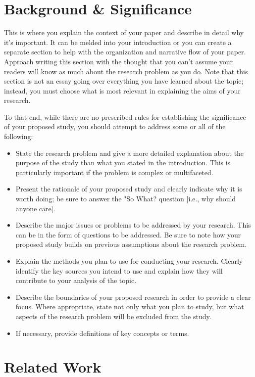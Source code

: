 \documentclass[10pt,twocolumn,letterpaper]{article}
\begin{document}
\section{Background \& Significance}
This is where you explain the context of your paper and describe in detail why it's important. It can be melded into your introduction or you can create a separate section to help with the organization and narrative flow of your paper. Approach writing this section with the thought that you can’t assume your readers will know as much about the research problem as you do. Note that this section is not an essay going over everything you have learned about the topic; instead, you must choose what is most relevant in explaining the aims of your research.

To that end, while there are no prescribed rules for establishing the significance of your proposed study, you should attempt to address some or all of the following:

\begin{itemize}
   \item State the research problem and give a more detailed explanation about the purpose of the study than what you stated in the introduction. This is particularly important if the problem is complex or multifaceted.
    \item Present the rationale of your proposed study and clearly indicate why it is worth doing; be sure to answer the "So What? question [i.e., why should anyone care].
    \item Describe the major issues or problems to be addressed by your research. This can be in the form of questions to be addressed. Be sure to note how your proposed study builds on previous assumptions about the research problem.
    \item Explain the methods you plan to use for conducting your research. Clearly identify the key sources you intend to use and explain how they will contribute to your analysis of the topic.
   \item Describe the boundaries of your proposed research in order to provide a clear focus. Where appropriate, state not only what you plan to study, but what aspects of the research problem will be excluded from the study.
   \item If necessary, provide definitions of key concepts or terms.
\end{itemize}

\section{Related Work}
\end{document}
